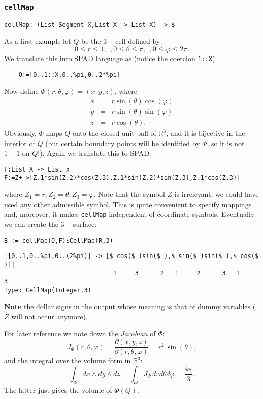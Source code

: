 \documentclass[12pt,a4paper]{article}
\newcommand{\RR}[1]{\mathbb{R}^{#1}}
\begin{document}
\subsubsection{{\tt cellMap}} 
\begin{lstlisting}
cellMap: (List Segment X,List X -> List X) -> $ 
\end{lstlisting}
As a first example let $Q$ be the $3-$cell defined by
\begin{displaymath}
 0\leq r\leq 1,\ \ ,0\leq \theta \leq \pi,\ \ ,0\leq\varphi\leq 2\pi.
\end{displaymath}
We translate this into SPAD language as (notice the coercion {\tt 1::X})
\begin{verbatim}
    Q:=[0..1::X,0..%pi,0..2*%pi]
\end{verbatim}
Now define $\Phi(r,\theta,\varphi)=(x,y,z)$, where
\begin{eqnarray*}
     x &=& r \sin(\theta) \cos(\varphi) \\
     y &=& r \sin(\theta) \sin(\varphi) \\
     z &=& r \cos(\theta).
\end{eqnarray*}
Obviously, $\Phi$  maps $Q$ onto the closed unit ball of $\RR 3$, and
it is bijective in the interior of $Q$ (but certain boundary points
will be identified by $\Phi$, so it is not $1-1$ on $Q$!). Again we
translate this to SPAD:
\begin{lstlisting}
F:List X -> List x
F:=Z+->[Z.1*sin(Z.2)*cos(Z.3),Z.1*sin(Z.2)*sin(Z.3),Z.1*cos(Z.3)]
\end{lstlisting}
where $Z_1=r,Z_2=\theta,Z_3=\varphi$. Note that the symbol $Z$ is
irrelevant, we could have used any other admissible symbol. This
is quite convenient to specify mappings and, moreover, it makes
{\tt cellMap} independent of coordinate symbols. 
Eventually we can create the $3-$surface:
\begin{lstlisting}
B := cellMap(Q,F)$CellMap(R,3)
\end{lstlisting}
\scriptsize
\begin{verbatim}
|[0..1,0..%pi,0..(2%pi)] -> [$ cos($ )sin($ ),$ sin($ )sin($ ),$ cos($ )]|
                              1     3      2   1     2      3   1     3
Type: CellMap(Integer,3)
\end{verbatim}
\normalsize
{\bf Note} the dollar signs in the output whose meaning is that of
dummy variables ($Z$ will not occur anymore).

For later reference we note down the {\em Jacobian} of $\Phi$:
\begin{displaymath}
  J_{\Phi}(r,\theta,\varphi)=
    \frac{\partial(x,y,z)}{\partial(r,\theta,\varphi)} =
      r^2\,\sin(\theta),
\end{displaymath}
and the integral over the volume form in $\RR 3$:
\begin{displaymath}
  \int_{\Phi} dx\wedge dy\wedge dz = \int_{Q} J_{\Phi}\,dr d\theta d\varphi 
  = \frac{4\pi}{3}.
\end{displaymath}
The latter just gives the volume of $\Phi(Q)$.
%
\end{document}
